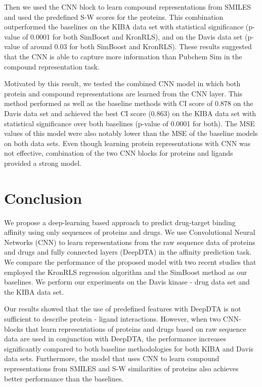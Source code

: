 \documentclass[11pt,letterpaper]{article}
\begin{document}
Then we used the CNN block to learn compound representations from SMILES and used the predefined S-W scores for the proteins. This combination outperformed the baselines on the KIBA data set with statistical significance (p-value of 0.0001 for both SimBoost and KronRLS), and on the Davis data set  (p-value of around 0.03 for both SimBoost and KronRLS). These results suggested that the CNN is able to capture more information than Pubchem Sim in the compound representation task.

Motivated by this result, we tested the combined CNN model in which both protein and compound representations are learned from the CNN layer. This method performed as well as the baseline methods with CI score of 0.878 on the Davis data set and achieved the best  CI score (0.863)  on the KIBA data set with statistical significance over both baselines (p-value of 0.0001 for both).  The MSE values of this model were also notably lower than the MSE of the baseline models on both data sets. Even though learning protein representations with CNN was not effective, combination of the two CNN blocks for proteins and ligands provided a strong model.


\section*{Conclusion}

We propose a deep-learning based approach to predict drug-target binding affinity using only sequences of proteins and drugs. We use Convolutional Neural Networks (CNN) to learn representations from the raw sequence data of proteins and drugs and  fully connected layers (DeepDTA) in the affinity prediction task. We compare the performance of the proposed model with two recent studies that employed the KronRLS regression algorithm \cite{pahikkala2014toward}  and the SimBoost method \cite{he2017simboost} as our baselines. We perform our experiments on the Davis kinase - drug data set and the KIBA data set. 

Our results showed that the use of predefined features with DeepDTA is not sufficient to describe protein - ligand interactions. However, when two CNN-blocks that learn representations of proteins and drugs based on raw sequence data are used in conjunction  with DeepDTA, the performance increases  significantly compared to both baseline methodologies for both KIBA and Davis data sets. Furthermore, the model that uses CNN to learn compound representations from SMILES and S-W similarities of proteins also achieves better performance than the baselines. 
\end{document}
